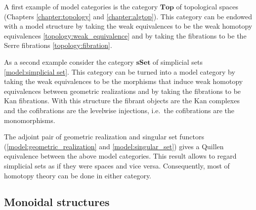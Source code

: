     \begin{example}
        A first example of model categories is the category $\mathbf{Top}$ of topological spaces (Chapters \ref{chapter:topology} and \ref{chapter:algtop}). This category can be endowed with a model structure by taking the weak equivalences to be the weak homotopy equivalences \ref{topology:weak_equivalence} and by taking the fibrations to be the Serre fibrations \ref{topology:fibration}.
    \end{example}
    \begin{example}\label{model:sset_model_structure}
        As a second example consider the category $\mathbf{sSet}$ of simplicial sets \ref{model:simplicial set}. This category can be turned into a model category by taking the weak equivalences to be the morphisms that induce weak homotopy equivalences between geometric realizations and by taking the fibrations to be Kan fibrations. With this structure the fibrant objects are the Kan complexes and the cofibrations are the levelwise injections, i.e.~the cofibrations are the monomorphisms.
    \end{example}


    \begin{property}[Quillen]\label{cat:quillen_sset_top}
        The adjoint pair of geometric realization and singular set functors (\ref{model:geometric_realization} and \ref{model:singular_set}) gives a Quillen equivalence between the above model categories. This result allows to regard simplicial sets as if they were spaces and vice versa. Consequently, most of homotopy theory can be done in either category.
    \end{property}

\subsection{Monoidal structures}

